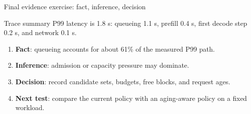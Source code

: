 \documentclass[aspectratio=169,11pt]{beamer}
\begin{document}

\begin{frame}{Final evidence exercise: fact, inference, decision}
  \begin{block}{Trace summary}
    P99 latency is 1.8 s: queueing 1.1 s, prefill 0.4 s, first decode step 0.2 s, and network 0.1 s.
  \end{block}
  \begin{enumerate}
    \item \textbf{Fact}: queueing accounts for about 61\% of the measured P99 path.
    \item \textbf{Inference}: admission or capacity pressure may dominate.
    \item \textbf{Decision}: record candidate sets, budgets, free blocks, and request ages.
    \item \textbf{Next test}: compare the current policy with an aging-aware policy on a fixed workload.
  \end{enumerate}
\end{frame}
\end{document}

